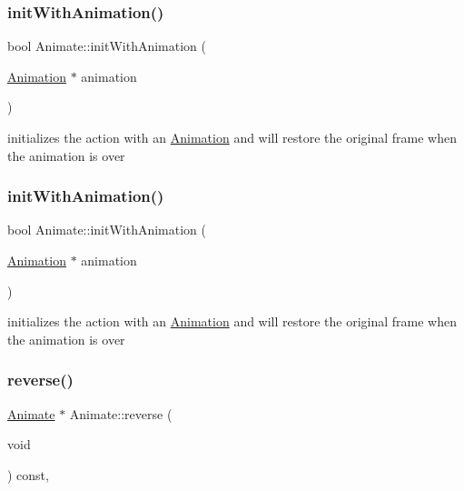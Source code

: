 \subsubsection{\texorpdfstring{init\+With\+Animation()}{initWithAnimation()}\hspace{0.1cm}{\footnotesize\ttfamily [1/2]}}
{\footnotesize\ttfamily bool Animate\+::init\+With\+Animation (\begin{DoxyParamCaption}\item[{\hyperlink{classAnimation}{Animation} $\ast$}]{animation }\end{DoxyParamCaption})}

initializes the action with an \hyperlink{classAnimation}{Animation} and will restore the original frame when the animation is over \mbox{\label{classAnimate_a12360cf2067d0dfa3470ff2a3c248c34}} 
\subsubsection{\texorpdfstring{init\+With\+Animation()}{initWithAnimation()}\hspace{0.1cm}{\footnotesize\ttfamily [2/2]}}
{\footnotesize\ttfamily bool Animate\+::init\+With\+Animation (\begin{DoxyParamCaption}\item[{\hyperlink{classAnimation}{Animation} $\ast$}]{animation }\end{DoxyParamCaption})}

initializes the action with an \hyperlink{classAnimation}{Animation} and will restore the original frame when the animation is over \mbox{\label{classAnimate_a30f0bdbce81651636bae3ad34b5b64b8}} 
\subsubsection{\texorpdfstring{reverse()}{reverse()}\hspace{0.1cm}{\footnotesize\ttfamily [1/2]}}
{\footnotesize\ttfamily \hyperlink{classAnimate}{Animate} $\ast$ Animate\+::reverse (\begin{DoxyParamCaption}\item[{void}]{ }\end{DoxyParamCaption}) const\hspace{0.3cm}{\ttfamily [override]}, {\ttfamily [virtual]}}

